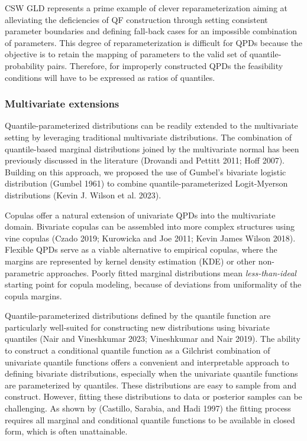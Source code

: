 \documentclass[
]{interact}
\begin{document}
CSW GLD represents a prime example of clever reparameterization aiming
at alleviating the deficiencies of QF construction through setting
consistent parameter boundaries and defining fall-back cases for an
impossible combination of parameters. This degree of reparameterization
is difficult for QPDs because the objective is to retain the mapping of
parameters to the valid set of quantile-probability pairs. Therefore,
for improperly constructed QPDs the feasibility conditions will have to
be expressed as ratios of quantiles.

\subsubsection*{Multivariate extensions}\label{multivariate-extensions}

Quantile-parameterized distributions can be readily extended to the
multivariate setting by leveraging traditional multivariate
distributions. The combination of quantile-based marginal distributions
joined by the multivariate normal has been previously discussed in the
literature (Drovandi and Pettitt 2011; Hoff 2007). Building on this
approach, we proposed the use of Gumbel's bivariate logistic
distribution (Gumbel 1961) to combine quantile-parameterized
Logit-Myerson distributions (Kevin J. Wilson et al. 2023).

Copulas offer a natural extension of univariate QPDs into the
multivariate domain. Bivariate copulas can be assembled into more
complex structures using vine copulas (Czado 2019; Kurowicka and Joe
2011; Kevin James Wilson 2018). Flexible QPDs serve as a viable
alternative to empirical copulas, where the margins are represented by
kernel density estimation (KDE) or other non-parametric approaches.
Poorly fitted marginal distributions mean \emph{less-than-ideal}
starting point for copula modeling, because of deviations from
uniformality of the copula margins.

Quantile-parameterized distributions defined by the quantile function
are particularly well-suited for constructing new distributions using
bivariate quantiles (Nair and Vineshkumar 2023; Vineshkumar and Nair
2019). The ability to construct a conditional quantile function as a
Gilchrist combination of univariate quantile functions offers a
convenient and interpretable approach to defining bivariate
distributions, especially when the univariate quantile functions are
parameterized by quantiles. These distributions are easy to sample from
and construct. However, fitting these distributions to data or posterior
samples can be challenging. As shown by (Castillo, Sarabia, and Hadi
1997) the fitting process requires all marginal and conditional quantile
functions to be available in closed form, which is often unattainable.
\end{document}
